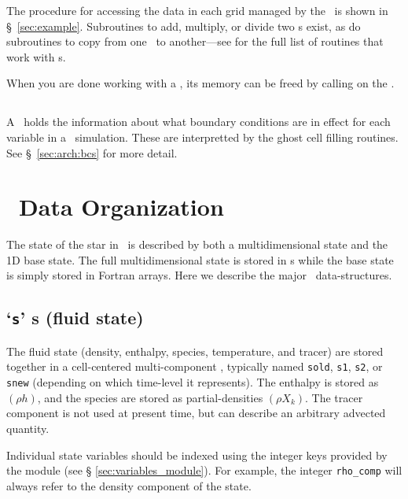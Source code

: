The procedure for accessing the data in each grid managed by the
\multifab\ is shown in \S~\ref{sec:example}.  Subroutines to add,
multiply, or divide two \multifab s exist, as do subroutines to copy
from one \multifab\ to another---see
 for the full list of
routines that work with \multifab s.


When you are done working with a \multifab, its memory can be freed by
calling  on the \multifab.




\subsection{\bctower}

A \bctower\ holds the information about what boundary conditions are
in effect for each variable in a
\maestro\ simulation.  These are interpretted by the ghost cell filling 
routines.  See \S~\ref{sec:arch:bcs} for more detail.

\section{\maestro\ Data Organization}

The state of the star in \maestro\ is described by both a
multidimensional state and the 1D base state.  The full
multidimensional state is stored in \multifab s while the base state
is simply stored in Fortran arrays.  Here we describe the
major \maestro\ data-structures.




\subsection{`{\tt s}' \multifab s (fluid state)}

The fluid state (density, enthalpy, species, temperature, and tracer)
are stored together in a cell-centered multi-component \multifab,
typically named {\tt sold}, {\tt s1}, {\tt s2}, or {\tt snew}
(depending on which time-level it represents).  The enthalpy is stored
as $(\rho h)$, and the species are stored as partial-densities $(\rho
X_k)$.  The tracer component is not used at present time, but can
describe an arbitrary advected quantity.

Individual state variables should be indexed using the integer keys
provided by the  module (see \S
\ref{sec:variables_module}).  For example, the integer {\tt rho\_comp}
will always refer to the density component of the state.

